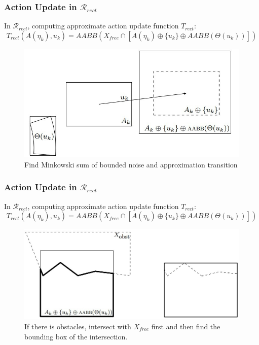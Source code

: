 \documentclass[compress]{beamer}
\begin{document}
\begin{frame} \frametitle{Action Update in $\mathcal{R}_{rect}$}
In $\mathcal{R}_{rect}$, computing approximate action update function $T_{rect} :$\\
			$$T_{rect}(A(\eta_k), u_k) = AABB(X_{free} \cap [A(\eta_k) \oplus \{ u_k \} \oplus AABB(\Theta(u_k))])$$
    \begin{figure}
    \includegraphics[scale=0.35]{step12.jpg}
    \caption{Find Minkowski sum of bounded noise and approximation transition}
    \end{figure}
		
\transboxout
\end{frame}


\begin{frame} \frametitle{Action Update in $\mathcal{R}_{rect}$}
In $\mathcal{R}_{rect}$, computing approximate action update function $T_{rect} :$\\
			$$T_{rect}(A(\eta_k), u_k) = AABB(X_{free} \cap [A(\eta_k) \oplus \{ u_k \} \oplus AABB(\Theta(u_k))])$$
    \begin{figure}
    \includegraphics[scale=0.35]{step34.jpg}
    \caption{If there is obstacles, intersect with $X_{free}$ first and
    then find the bounding box of the intersection.}
    \end{figure}
		
\transboxout
\end{frame}
\end{document}
